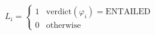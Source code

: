 \documentclass[border=3pt,varwidth=16cm]{standalone}
\begin{document}
$\displaystyle L_i = \begin{cases} 1 & \mathrm{verdict}(\varphi_i) = \text{ENTAILED} \\ 0 & \text{otherwise} \end{cases}$
\end{document}
